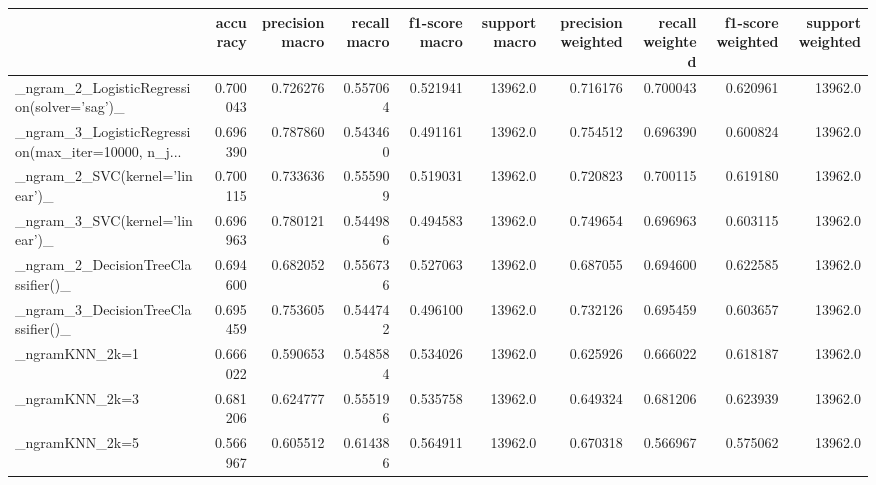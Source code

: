 \begin{tabular}{lrrrrrrrrr}
\toprule
{} &  accuracy &  precision macro &  recall macro &  f1-score macro &  support macro &  precision weighted &  recall weighted &  f1-score weighted &  support weighted \\
\midrule
\_ngram\_2\_LogisticRegression(solver='sag')\_         &  0.700043 &         0.726276 &      0.557064 &        0.521941 &        13962.0 &            0.716176 &         0.700043 &           0.620961 &           13962.0 \\
\_ngram\_3\_LogisticRegression(max\_iter=10000, n\_j... &  0.696390 &         0.787860 &      0.543460 &        0.491161 &        13962.0 &            0.754512 &         0.696390 &           0.600824 &           13962.0 \\
\_ngram\_2\_SVC(kernel='linear')\_                     &  0.700115 &         0.733636 &      0.555909 &        0.519031 &        13962.0 &            0.720823 &         0.700115 &           0.619180 &           13962.0 \\
\_ngram\_3\_SVC(kernel='linear')\_                     &  0.696963 &         0.780121 &      0.544986 &        0.494583 &        13962.0 &            0.749654 &         0.696963 &           0.603115 &           13962.0 \\
\_ngram\_2\_DecisionTreeClassifier()\_                 &  0.694600 &         0.682052 &      0.556736 &        0.527063 &        13962.0 &            0.687055 &         0.694600 &           0.622585 &           13962.0 \\
\_ngram\_3\_DecisionTreeClassifier()\_                 &  0.695459 &         0.753605 &      0.544742 &        0.496100 &        13962.0 &            0.732126 &         0.695459 &           0.603657 &           13962.0 \\
\_ngramKNN\_2k=1                                     &  0.666022 &         0.590653 &      0.548584 &        0.534026 &        13962.0 &            0.625926 &         0.666022 &           0.618187 &           13962.0 \\
\_ngramKNN\_2k=3                                     &  0.681206 &         0.624777 &      0.555196 &        0.535758 &        13962.0 &            0.649324 &         0.681206 &           0.623939 &           13962.0 \\
\_ngramKNN\_2k=5                                     &  0.566967 &         0.605512 &      0.614386 &        0.564911 &        13962.0 &            0.670318 &         0.566967 &           0.575062 &           13962.0 \\

\end{tabular}
